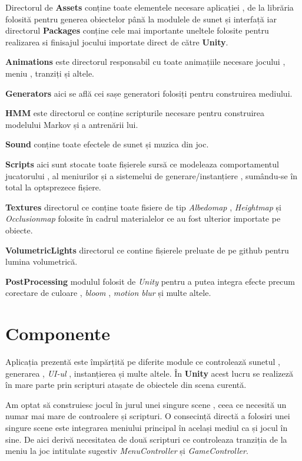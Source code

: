 Directorul de \textbf{Assets} conține toate elementele necesare aplicației , de la librăria folosită pentru generea obiectelor până la modulele de sunet și interfață iar directorul \textbf{Packages} conține cele mai importante uneltele folosite pentru realizarea si finisajul jocului importate direct de către \textbf{Unity}.\par

\textbf{Animations}  este directorul responsabil cu toate animațiile necesare jocului , meniu , tranziți și altele.\par

\textbf{Generators} aici se află cei sașe generatori folosiți pentru construirea mediului.\par

\textbf{HMM} este directorul ce conține scripturile necesare pentru construirea modelului Markov și a antrenării lui.\par

\textbf{Sound} conține toate efectele de sunet și muzica din joc.\par

\textbf{Scripts} aici sunt stocate toate fișierele sursă ce modeleaza comportamentul jucatorului , al meniurilor și a sistemelui de generare/instanțiere , sumându-se în total la optsprezece fișiere.\par

\textbf{Textures} directorul ce conține toate fisiere de tip \textit{Albedomap} , \textit{Heightmap} și \textit{Occlusionmap} folosite în cadrul materialelor ce au fost ulterior importate pe obiecte.\par

\textbf{VolumetricLights} directorul ce contine fișierele preluate de pe github pentru lumina volumetrică.\par

\textbf{PostProcessing} modulul folosit de \textit{Unity} pentru a putea integra efecte precum corectare de culoare , \textit{bloom} , \textit{motion blur} și multe altele.\par


\section{Componente}
Aplicația prezentă este împărțită pe diferite module ce controlează sunetul , generarea , \textit{UI-ul} , instanțierea și multe altele. În \textbf{Unity} acest lucru se realizeză în mare parte prin scripturi atașate de obiectele din scena curentă. \par
Am optat să construiesc jocul în jurul unei singure scene , ceea ce necesită un numar mai mare de controalere și scripturi. O consecință directă a folosiri unei singure scene este integrarea meniului principal în același mediul ca și jocul în sine. De aici derivă necesitatea de două scripturi ce controleaza tranziția de la meniu la joc intitulate sugestiv \textit{MenuController} și \textit{GameController}.\par

